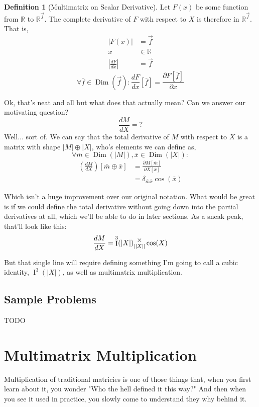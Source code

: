 \documentclass[12pt]{article}
\theoremstyle{definition}
\newtheorem{definition}{Definition}[section]
\theoremstyle{case}
\theoremstyle{ppart}
\DeclareMathOperator{\Dim}{Dim}
\DeclareMathOperator{\Ident}{I}
\newcommand{\mmult}[1]{\text{\raisebox{1ex}{$\underset{#1}{\times}$}}}
\begin{document}
\begin{definition}[Multimatrix on Scalar Derivative]
\label{ms_derivative}
Let $F(x)$ be some function from $\mathbb{R}$ to $\mathbb{R}^{\vec{f}}$.
The complete derivative of $F$ with respect to $X$ is therefore in
$\mathbb{R}^{\vec{f}}$. That is,
\begin{align*}
|F(x)| &= \vec{f} \\
x &\in \mathbb{R} \\
\left|\frac{dF}{dx}\right| &= \vec{f}
\end{align*}
\[
\forall \bar{f} \in \Dim(\vec{f}):
        \frac{dF}{dx}[\bar{f}] =
        \frac{\partial F[\bar{f}]}{\partial x}
\]
\end{definition}

Ok, that's neat and all but what does that actually mean? Can we answer our motivating 
question?
\[\frac{dM}{dX} = ? \]
Well... sort of. We can say that the total derivative of $M$ with respect to $X$ is
a matrix with shape $|M| \oplus |X|$, who's elements we can define as,
\[\forall \bar{m} \in \Dim(|M|), \bar{x} \in \Dim(|X|):\]
\begin{align*}
\left( \frac{dM}{dX} \right)[\bar{m} \oplus \bar{x}]
&= \frac{\partial M[\bar{m}]}{\partial X[\bar{x}]} \\
&= \delta_{\bar{m}\bar{x}}\cos(\bar{x})
\end{align*}

Which isn't a huge improvement over our original notation. What would be great is
if we could define the total derivative without going down into the partial derivatives
at all, which we'll be able to do in later sections. As a sneak peak, that'll look
like this:
\[
\frac{dM}{dX} = \Ident^3(|X|) \mmult{||X||} \cos(X)
\]

But that single line will require defining something I'm going to call a cubic
identity, $\Ident^3(|X|)$, as well as multimatrix multiplication.

\subsection*{Sample Problems}
TODO

\section{Multimatrix Multiplication}

Multiplication of traditional matricies is one of those things that, when you
first learn about it, you wonder "Who the hell defined it this way?" And then
when you see it used in practice, you slowly come to understand they why behind
it.
\end{document}
